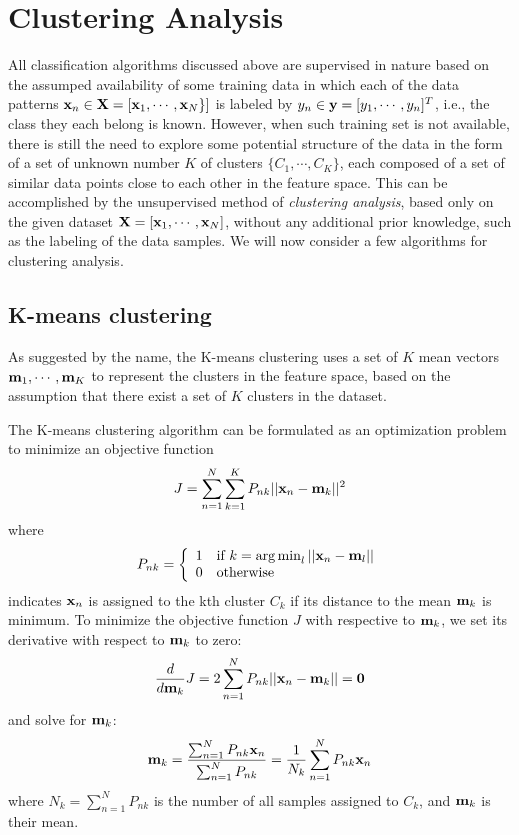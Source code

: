 \documentclass{article}
\DeclareMathOperator*{\argmin}{arg\,min}
\begin{document}
\section{Clustering Analysis}

All classification algorithms discussed above are supervised in nature 
based on the assumped availability of some training data in which each 
of the data patterns ${\bf x}_n\in {\bf X}=[{\bf x}_1,\cdots,{\bf x}_N\}]$
is labeled by $y_n\in{\bf y}=[y_1,\cdots,y_n]^T$, i.e., the class they 
each belong is known. However, when such training set is not available,
there is still the need to explore some potential structure of the data 
in the form of a set of unknown number $K$ of clusters $\{C_1,\cdots,C_K\}$,
each composed of a set of similar data points close to each other in the 
feature space. This can be accomplished by the unsupervised method of 
{\em clustering analysis}, based only on the given dataset 
${\bf X}=[{\bf x}_1,\cdots,{\bf x}_N]$, without any additional prior
knowledge, such as the labeling of the data samples. We will now consider 
a few algorithms for clustering analysis.


\subsection{K-means clustering}

As suggested by the name, the K-means clustering uses a set of $K$ 
mean vectors ${\bf m}_1,\cdots,{\bf m}_K$ to represent the clusters 
in the feature space, based on the assumption that there exist a set
of $K$ clusters in the dataset. 

The K-means clustering algorithm can be formulated as an optimization
problem to minimize an objective function
\begin{equation}
  J=\sum_{n=1}^N\sum_{k=1}^K P_{nk}||{\bf x}_n-{\bf m}_k||^2
\end{equation}
where 
\begin{equation}
  P_{nk}=\left\{\begin{array}{ll}
  1 & \mbox{if $k=\argmin_l ||{\bf x}_n-{\bf m}_l||$}\\
  0 & \mbox{otherwise}
  \end{array}\right.
\end{equation}
indicates ${\bf x}_n$ is assigned to the kth cluster $C_k$ if its
distance to the mean ${\bf m}_k$ is minimum. To minimize the objective 
function $J$ with respective to ${\bf m}_k$, we set its derivative with
respect to ${\bf m}_k$ to zero:
\begin{equation}
  \frac{d}{d{\bf m}_k}J=2\sum_{n=1}^N P_{nk}||{\bf x}_n-{\bf m}_k||={\bf 0}
\end{equation}
and solve for ${\bf m}_k$:
\begin{equation}
  {\bf m}_k=\frac{\sum_{n=1}^N P_{nk}{\bf x}_n}{\sum_{n=1}^N P_{nk}}
  =\frac{1}{N_k}\sum_{n=1}^N P_{nk}{\bf x}_n
\end{equation}
where $N_k=\sum_{n=1}^N P_{nk}$ is the number of all samples assigned to $C_k$,
and ${\bf m}_k$ is their mean.
\end{document}
